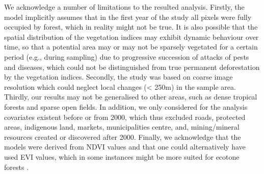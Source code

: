 
We acknowledge a number of limitations to the resulted analysis. Firstly, the model implicitly assumes that in the first year of the study all pixels were fully occupied by forest, which in reality might not be true. It is also possible that the spatial distribution of the vegetation indices may exhibit dynamic behaviour over time, so that a potential area may or may not be sparsely vegetated for a certain period (e.g., during sampling) due to progressive succession of attacks of pests and diseases, which could not be distinguished from true permanent deforestation by the vegetation indices. Secondly, the study was based on  coarse image resolution which could neglect local changes (< 250m) in the sample area. Thirdly, our results may not be generalised to other areas, such as dense tropical forests and sparse open fields. In addition, we only considered for the analysis covariates existent before or from 2000, which thus excluded roads, protected areas, indigenous land, markets, municipalities centre, and, mining/mineral resources created or discovered after 2000. Finally, we acknowledge that the models were derived from NDVI values and that one could alternatively have used EVI values, which in some instances might be more suited for ecotone forests \citep{ratana_huete_ferreira_2005,bayma_sano_2015,didan_munoz_2015}.

\let\cleardoublepage\clearpage
\begin{appendices} \label{appendix}
\renewcommand{\thechapter}{A.\arabic{chapter}}

\end{appendices}
 